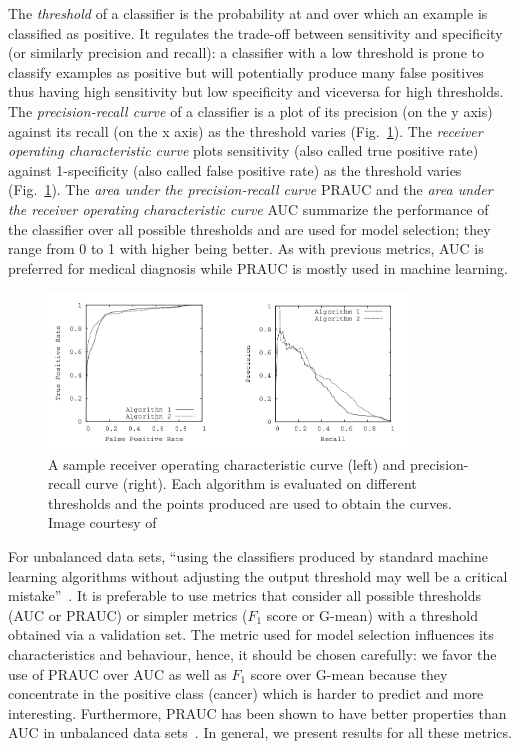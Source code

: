 The \emph{threshold} of a classifier is the probability at and over which an example is classified as positive. It regulates the trade-off between sensitivity and specificity (or similarly precision and recall): a classifier with a low threshold is prone to classify examples as positive but will potentially produce many false positives thus having high sensitivity but low specificity and viceversa for high thresholds. The \emph{precision-recall curve} of a classifier is a plot of its precision (on the y axis) against its recall (on the x axis) as the threshold varies (Fig.~\ref{fig:AUCandPRAUC}). The \emph{receiver operating characteristic curve} plots sensitivity (also called true positive rate) against 1-specificity (also called false positive rate) as the threshold varies (Fig.~\ref{fig:AUCandPRAUC}). The \emph{area under the precision-recall curve} PRAUC and the \emph{area under the receiver operating characteristic curve} AUC summarize the performance of the classifier over all possible thresholds and are used for model selection; they range from 0 to 1 with higher being better. As with previous metrics, AUC is preferred for medical diagnosis while PRAUC is mostly used in machine learning. 
\begin{figure}[h]
	\centering
	\includegraphics[width = 0.85\textwidth]{plots/AUCandPRAUC.png}
	\caption[Sample ROC and PR curves]{A sample receiver operating characteristic curve (left) and precision-recall curve (right). Each algorithm is evaluated on different thresholds and the points produced are used to obtain the curves. Image courtesy of~\cite{Davis2006}}
	\label{fig:AUCandPRAUC}
\end{figure}

For unbalanced data sets, ``using the classifiers produced by standard machine learning algorithms without adjusting the output threshold may well be a critical mistake''~\cite{Provost2000}. It is preferable to use metrics that consider all possible thresholds (AUC or PRAUC) or simpler metrics ($F_1$ score or G-mean) with a threshold obtained via a validation set. The metric used for model selection influences its characteristics and behaviour, hence, it should be chosen carefully: we favor the use of PRAUC over AUC as well as $F_1$ score over G-mean because they concentrate in the positive class (cancer) which is harder to predict and more interesting. Furthermore, PRAUC has been shown to have better properties than AUC in unbalanced data sets~\cite{Davis2006}. In general, we present results for all these metrics. 


